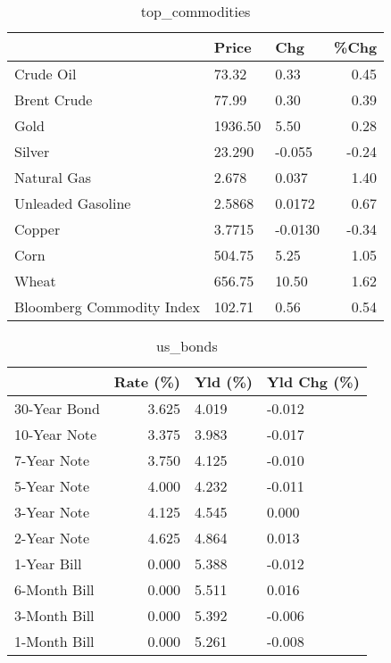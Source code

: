 \documentclass{article}%
\begin{document}
\begin{table}[htbp]%
\caption{top\_commodities}%
\centering%
\begin{adjustbox}{width=1\textwidth}%
\begin{tabular}{lllr}
\toprule
                          &   Price &     Chg &  \%Chg \\
\midrule
               Crude Oil  &   73.32 &    0.33 &  0.45 \\
             Brent Crude  &   77.99 &    0.30 &  0.39 \\
                    Gold  & 1936.50 &    5.50 &  0.28 \\
                  Silver  &  23.290 &  -0.055 & -0.24 \\
             Natural Gas  &   2.678 &   0.037 &  1.40 \\
       Unleaded Gasoline  &  2.5868 &  0.0172 &  0.67 \\
                  Copper  &  3.7715 & -0.0130 & -0.34 \\
                    Corn  &  504.75 &    5.25 &  1.05 \\
                   Wheat  &  656.75 &   10.50 &  1.62 \\
Bloomberg Commodity Index &  102.71 &    0.56 &  0.54 \\
\bottomrule
\end{tabular}
%
\end{adjustbox}%
\end{table}

%


\begin{table}[htbp]%
\caption{us\_bonds}%
\centering%
\begin{adjustbox}{width=1\textwidth}%
\begin{tabular}{lrll}
\toprule
             &  Rate (\%) & Yld (\%) & Yld Chg (\%) \\
\midrule
30-Year Bond &     3.625 &   4.019 &      -0.012 \\
10-Year Note &     3.375 &   3.983 &      -0.017 \\
 7-Year Note &     3.750 &   4.125 &      -0.010 \\
 5-Year Note &     4.000 &   4.232 &      -0.011 \\
 3-Year Note &     4.125 &   4.545 &       0.000 \\
 2-Year Note &     4.625 &   4.864 &       0.013 \\
 1-Year Bill &     0.000 &   5.388 &      -0.012 \\
6-Month Bill &     0.000 &   5.511 &       0.016 \\
3-Month Bill &     0.000 &   5.392 &      -0.006 \\
1-Month Bill &     0.000 &   5.261 &      -0.008 \\
\bottomrule
\end{tabular}
%
\end{adjustbox}%
\end{table}
\end{document}
